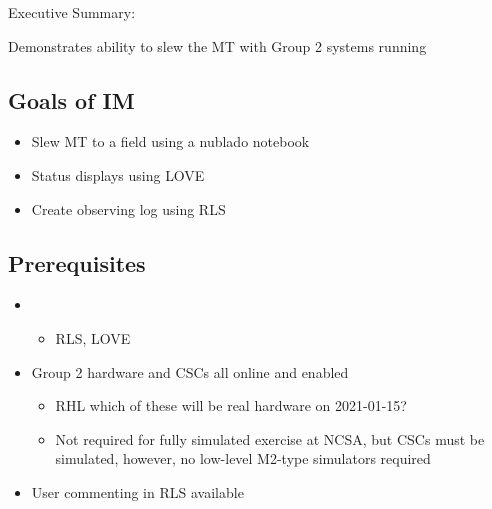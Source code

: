
Executive Summary:

Demonstrates ability to slew the MT with Group 2 systems running

\subsection{Goals of IM}
\begin{itemize}
\item Slew \gls{MT} to a field using a nublado notebook
\item Status displays using \gls{LOVE}
\item Create observing log using \gls{RLS}
\end{itemize}

\subsection{Prerequisites}
\begin{itemize}
\item{}
  \begin{itemize}
  \item \gls{RLS}, \gls{LOVE}
  \end{itemize}
\item{Group 2 hardware and \glspl{CSC} all online and enabled}
  \begin{itemize}
  \item RHL which of these will be real hardware on 2021-01-15?
  \item Not required for fully simulated exercise at NCSA, but \glspl{CSC} must be simulated,
    however, no low-level M2-type simulators required
  \end{itemize}
\item{User commenting in \gls{RLS} available}
\end{itemize}


